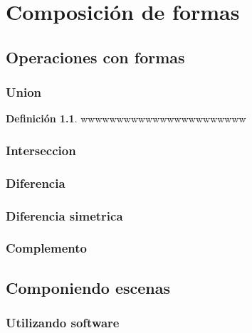 \documentclass[
  16pt,
]{krantz}
\theoremstyle{definition}
\newtheorem{definition}{Definición}[chapter]
\theoremstyle{definition}
\theoremstyle{definition}
\theoremstyle{definition}
\theoremstyle{remark}
\begin{document}
\hypertarget{composiciuxf3n-de-formas}{%
\chapter{Composición de formas}\label{composiciuxf3n-de-formas}}

\hypertarget{operaciones-con-formas}{%
\section{Operaciones con formas}\label{operaciones-con-formas}}

\hypertarget{union}{%
\subsection{Union}\label{union}}

\begin{definition}
\protect\hypertarget{def:unnamed-chunk-1}{}\label{def:unnamed-chunk-1}wwwwwwwwwwwwwwwwwwwwwww
\end{definition}

\hypertarget{interseccion}{%
\subsection{Interseccion}\label{interseccion}}

\hypertarget{diferencia}{%
\subsection{Diferencia}\label{diferencia}}

\hypertarget{diferencia-simetrica}{%
\subsection{Diferencia simetrica}\label{diferencia-simetrica}}

\hypertarget{complemento}{%
\subsection{Complemento}\label{complemento}}

\hypertarget{componiendo-escenas}{%
\section{Componiendo escenas}\label{componiendo-escenas}}

\hypertarget{utilizando-software}{%
\subsection{Utilizando software}\label{utilizando-software}}
\end{document}
